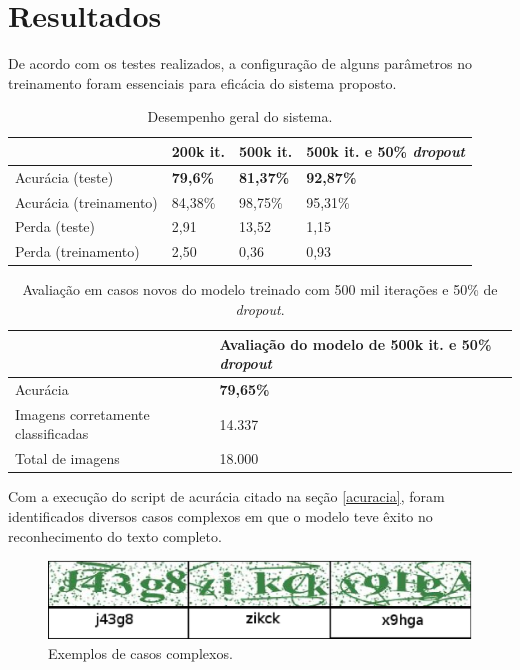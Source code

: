 \section{Resultados}

De acordo com os testes realizados, a configuração de alguns
parâmetros no treinamento foram essenciais para eficácia do sistema
proposto.

\begin{table}[H]
\begin{center}
\begin{tabular}{|p{2.3cm}|p{2.3cm}|p{2.3cm}|p{2.3cm}|}
\hline
\textbf{} & \textbf{200k it.} & \textbf{500k it.} & \textbf{500k it. e 50\% \textit{dropout}} \\
\hline
Acurácia (teste) & {\bf 79,6\%} & {\bf 81,37\%} & {\bf 92,87\%} \\
\hline
Acurácia (treinamento) & 84,38\% & 98,75\% & 95,31\% \\
\hline
Perda (teste) & 2,91 & 13,52 & 1,15 \\
\hline
Perda (treinamento) & 2,50 & 0,36 & 0,93 \\
\hline
\end{tabular}
\caption{Desempenho geral do sistema.}
\label{tab:system_efficency}
\end{center}
\end{table}

\begin{table}[H]
\begin{center}
\begin{tabular}{|p{5cm}|p{5cm}|}
\hline
\textbf{} & \textbf{Avaliação do modelo de 500k it. e 50\% \textit{dropout}} \\
\hline
Acurácia & {\bf 79,65\%} \\
\hline
Imagens corretamente classificadas & 14.337 \\
\hline
Total de imagens & 18.000 \\
\hline
\end{tabular}
\caption{Avaliação em casos novos do modelo treinado com 500 mil
  iterações e 50\% de \textit{dropout}.}
\label{tab:system_evaluation}
\end{center}
\end{table}

Com a execução do script de acurácia citado na seção \ref{acuracia},
foram identificados diversos casos complexos em que o modelo teve
êxito no reconhecimento do texto completo.

\begin{figure}[H]
\centering
\includegraphics[scale=0.8]{imagens/complex_cases}
\caption{Exemplos de casos complexos.}
\label{fig:complex_cases}
\end{figure}


